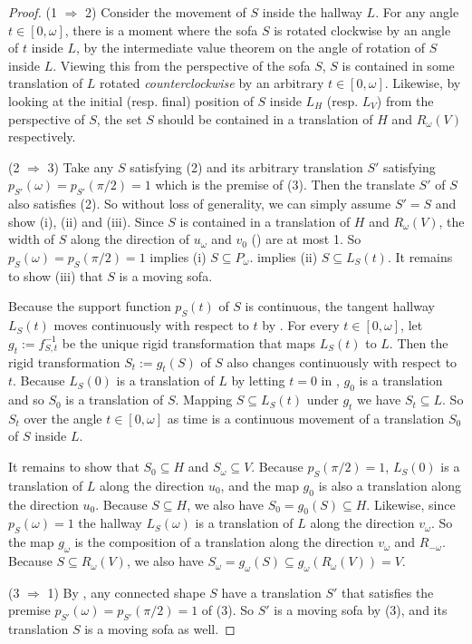 \begin{proof}
(1 \(\Rightarrow\) 2) Consider the movement of \(S\) inside the hallway \(L\). For any angle \(t \in [0, \omega]\), there is a moment where the sofa \(S\) is rotated clockwise by an angle of \(t\) inside \(L\), by the intermediate value theorem on the angle of rotation of \(S\) inside \(L\). Viewing this from the perspective of the sofa \(S\), \(S\) is contained in some translation of \(L\) rotated \emph{counterclockwise} by an arbitrary \(t \in [0, \omega]\). Likewise, by looking at the initial (resp. final) position of \(S\) inside \(L_H\) (resp. \(L_V\)) from the perspective of \(S\), the set \(S\) should be contained in a translation of \(H\) and \(R_\omega(V)\) respectively.

(2 \(\Rightarrow\) 3) Take any \(S\) satisfying (2) and its arbitrary translation \(S'\) satisfying \(p_{S'}(\omega) = p_{S'}(\pi/2) = 1\) which is the premise of (3). Then the translate \(S'\) of \(S\) also satisfies (2). So without loss of generality, we can simply assume \(S' = S\) and show (i), (ii) and (iii). Since \(S\) is contained in a translation of \(H\) and \(R_\omega(V)\), the width of \(S\) along the direction of \(u_\omega\) and \(v_0\) () are at most 1. So \(p_S(\omega) = p_S(\pi/2) = 1\) implies (i) \(S \subseteq P_\omega\).  implies (ii) \(S \subseteq L_S(t)\). It remains to show (iii) that \(S\) is a moving sofa.

Because the support function \(p_S(t)\) of \(S\) is continuous, the tangent hallway \(L_S(t)\) moves continuously with respect to \(t\) by . For every \(t \in [0, \omega]\), let \(g_t := f_{S, t}^{-1}\) be the unique rigid transformation that maps \(L_S(t)\) to \(L\). Then the rigid transformation \(S_t := g_t(S)\) of \(S\) also changes continuously with respect to \(t\). Because \(L_S(0)\) is a translation of \(L\) by letting \(t=0\) in , \(g_0\) is a translation and so \(S_0\) is a translation of \(S\). Mapping \(S \subseteq L_S(t)\) under \(g_t\) we have \(S_t \subseteq L\). So \(S_t\) over the angle \(t \in [0, \omega]\) as time is a continuous movement of a translation \(S_0\) of \(S\) inside \(L\).

It remains to show that \(S_0 \subseteq H\) and \(S_\omega \subseteq V\). Because \(p_S(\pi/2) = 1\), \(L_S(0)\) is a translation of \(L\) along the direction \(u_0\), and the map \(g_0\) is also a translation along the direction \(u_0\). Because \(S \subseteq H\), we also have \(S_0 = g_0(S) \subseteq H\). Likewise, since \(p_S(\omega) = 1\) the hallway \(L_S(\omega)\) is a translation of \(L\) along the direction \(v_\omega\). So the map \(g_\omega\) is the composition of a translation along the direction \(v_\omega\) and \(R_{-\omega}\). Because \(S \subseteq R_\omega(V)\), we also have \(S_\omega = g_\omega(S) \subseteq g_\omega(R_\omega(V)) = V\).

(3 \(\Rightarrow\) 1) By , any connected shape \(S\) have a translation \(S'\) that satisfies the premise \(p_{S'}(\omega) = p_{S'}(\pi/2) = 1\) of (3). So \(S'\) is a moving sofa by (3), and its translation \(S\) is a moving sofa as well.
\end{proof}